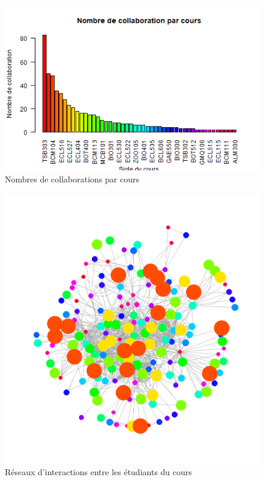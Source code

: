 \documentclass[9pt,twocolumn,twoside,]{pnas-new}
\begin{document}
\begin{figure}
  \centering
  \includegraphics[width=\linewidth]{sigle3.png}
  \caption{Nombres de collaborations par cours}
  \label{fig:sigle3}
\end{figure}

\begin{figure}
  \centering
  \includegraphics[width=\linewidth]{matrice.png}
  \caption{Réseaux d'interactions entre les étudiants du cours}
  \label{fig:matrice}
\end{figure}
\end{document}
